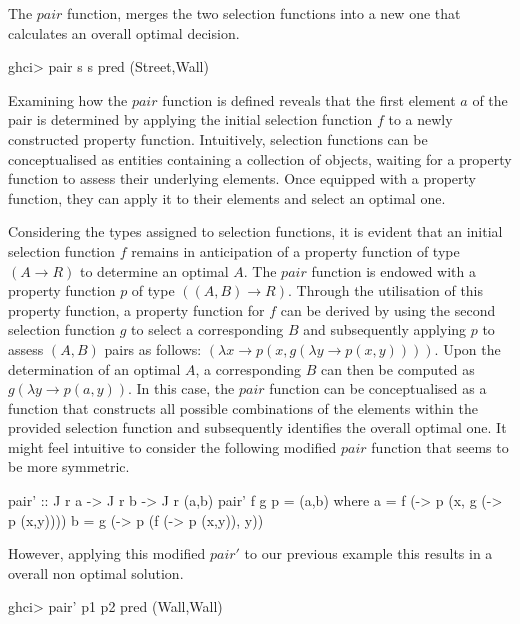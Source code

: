 \documentclass[runningheads]{llncs}
\begin{document}
The \(pair\) function, merges the two selection functions into a new one
that calculates an overall optimal decision.

\begin{haskell}
ghci> pair s s pred
(Street,Wall)
\end{haskell}

Examining how the \(pair\) function is defined reveals that the first
element \(a\) of the pair is determined by applying the initial
selection function \(f\) to a newly constructed property function.
Intuitively, selection functions can be conceptualised as entities
containing a collection of objects, waiting for a property function to
assess their underlying elements. Once equipped with a property
function, they can apply it to their elements and select an optimal one.

\qquad Considering the types assigned to selection functions, it is
evident that an initial selection function \(f\) remains in anticipation
of a property function of type \((A \rightarrow R)\) to determine an
optimal \(A\). The \(pair\) function is endowed with a property function
\(p\) of type \(((A,B) \rightarrow R)\). Through the utilisation of this
property function, a property function for \(f\) can be derived by using
the second selection function \(g\) to select a corresponding \(B\) and
subsequently applying \(p\) to assess \((A,B)\) pairs as follows:
\((\lambda x \rightarrow p (x, g (\lambda y \rightarrow p (x,y))))\).
Upon the determination of an optimal \(A\), a corresponding \(B\) can
then be computed as \(g (\lambda y \rightarrow p (a,y))\). In this case,
the \(pair\) function can be conceptualised as a function that
constructs all possible combinations of the elements within the provided
selection function and subsequently identifies the overall optimal one.
It might feel intuitive to consider the following modified \(pair\)
function that seems to be more symmetric.

\begin{code}
pair' :: J r a -> J r b -> J r (a,b)
pair' f g p = (a,b)
  where
      a = f (\x -> p (x, g (\y -> p (x,y))))
      b = g (\y -> p (f (\x -> p (x,y)), y))
\end{code}

However, applying this modified \(pair'\) to our previous example this
results in a overall non optimal solution.

\begin{haskell}
ghci> pair' p1 p2 pred
(Wall,Wall)
\end{haskell}
\end{document}
